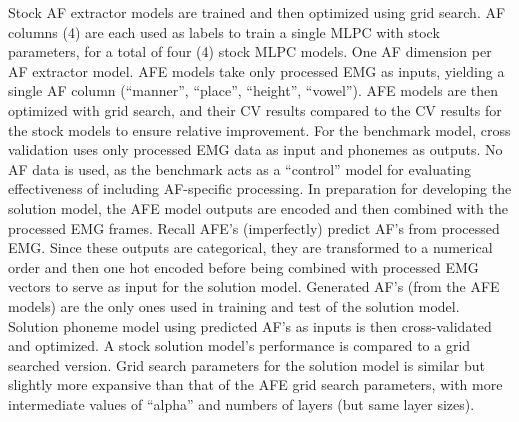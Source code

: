 \documentclass[conference]{IEEEtran}
\begin{document}
Stock AF extractor models are trained and then optimized using grid search. AF columns (4) are each used as labels to train a single MLPC with stock parameters, for a total of four (4) stock MLPC models. One AF dimension per AF extractor model. AFE models take only processed EMG as inputs, yielding a single AF column (“manner”, “place”, “height”, “vowel”). AFE models are then optimized with grid search, and their CV results compared to the CV results for the stock models to ensure relative improvement. For the benchmark model, cross validation uses only processed EMG data as input and phonemes as outputs. No AF data is used, as the benchmark acts as a “control” model for evaluating effectiveness of including AF-specific processing. In preparation for developing the solution model, the AFE model outputs are encoded and then combined with the processed EMG frames. Recall  AFE's (imperfectly) predict AF's from processed EMG. Since these outputs are categorical, they are transformed to a numerical order and then one hot encoded before being combined with processed EMG vectors to serve as input for the solution model. Generated AF's (from the AFE models) are the only ones used in training and test of the solution model. Solution phoneme model using predicted AF's as inputs is then cross-validated and optimized. A stock solution model's performance is compared to a grid searched version. Grid search parameters for the solution model is similar but slightly more expansive than that of the AFE grid search parameters, with more intermediate values of “alpha” and numbers of layers (but same layer sizes).
\end{document}
